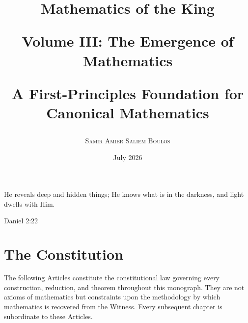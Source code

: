 \documentclass[12pt,anyside]{book}
\begin{document}
\newenvironment{completionaudit}
{\section*{Completion Audit}}
{}


\title{
    {\Huge\bfseries Mathematics of the King} \par
    \vspace{0.75cm}
    {\LARGE Volume III: The Emergence of Mathematics} \par
    \vspace{0.5cm}
    {\large A First-Principles Foundation for Canonical Mathematics}
}

\author{\large\textsc{Samir Amier Saliem Boulos}}
\date{July 2026}


\frontmatter

\maketitle

\newpage
\vspace*{\fill}
\begin{center}
    \epigraph{He reveals deep and hidden things; He knows what is in the darkness, and light dwells with Him.}{Daniel 2:22}
\end{center}
\vspace*{\fill}
\newpage

\chapter{The Constitution}

The following Articles constitute the constitutional law governing every
construction, reduction, and theorem throughout this monograph. They are not
axioms of mathematics but constraints upon the methodology by which mathematics
is recovered from the Witness. Every subsequent chapter is subordinate to these
Articles.

\vspace{1em}
\end{document}
